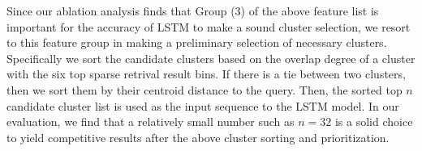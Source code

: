 Since our ablation  analysis finds that Group  (3) of the above feature list
is important for the accuracy of LSTM to make a sound cluster selection, we resort to this feature group in making 
a preliminary selection of  necessary clusters. 
Specifically we sort the candidate clusters based on the overlap degree of a cluster with the six top sparse retrival result bins. 
If there is a tie between two clusters, then we sort them by their centroid distance to the query.
Then, the sorted  top $n$ candidate cluster list is used as the input sequence to the LSTM model. 
In our evaluation, we find that a relatively small number such as $n=32$ is a solid choice  to yield competitive results  after the above cluster sorting and prioritization.


